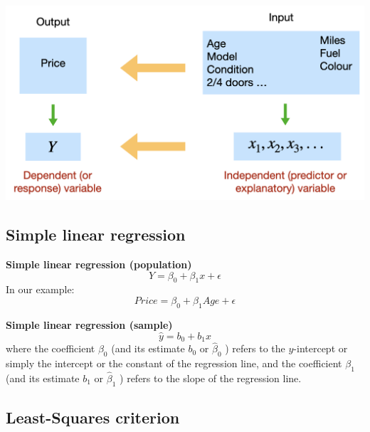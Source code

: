 \documentclass[
]{article}
\begin{document}
\begin{center}\includegraphics[width=0.6\linewidth,height=0.6\textheight]{figures/motivation2} \end{center}

\hypertarget{simple-linear-regression}{%
\subsection{Simple linear regression}\label{simple-linear-regression}}

\textbf{Simple linear regression (population)}
\[Y=\beta_0+\beta_1 x+\epsilon\] In our example:
\[Price=\beta_0+\beta_1 Age+\epsilon\]

\textbf{Simple linear regression (sample)} \[\hat{y}=b_0+b_1 x\] where
the coefficient \(\beta_0\) (and its estimate \(b_0\) or
\(\hat{\beta}_0\) ) refers to the \(y\)-intercept or simply the
intercept or the constant of the regression line, and the coefficient
\(\beta_1\) (and its estimate \(b_1\) or \(\hat{\beta}_1\) ) refers to
the slope of the regression line.

\hypertarget{least-squares-criterion}{%
\subsection{Least-Squares criterion}\label{least-squares-criterion}}
\end{document}
